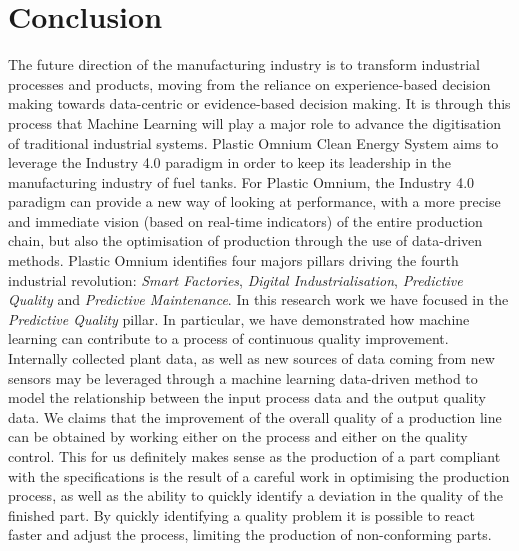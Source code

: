 \chapter*{Conclusion}
\thispagestyle{empty}

The future direction of the manufacturing industry is to transform industrial processes and products, moving from the reliance on experience-based decision making towards data-centric or evidence-based decision making. It is through this process that Machine Learning will play a major role to advance the digitisation of traditional industrial systems. Plastic Omnium Clean Energy System aims to leverage the Industry 4.0 paradigm in order to keep its leadership in the manufacturing industry of fuel tanks. For Plastic Omnium, the Industry 4.0 paradigm can provide a new way of looking at performance, with a more precise and immediate vision (based on real-time indicators) of the entire production chain, but also the optimisation of production through the use of data-driven methods. Plastic Omnium identifies four majors pillars driving the fourth industrial revolution: \textit{Smart Factories}, \textit{Digital Industrialisation}, \textit{Predictive Quality} and \textit{Predictive Maintenance}. In this research work we have focused in the \textit{Predictive Quality} pillar. In particular, we have demonstrated how machine learning can contribute to a process of continuous quality improvement. Internally collected plant data, as well as new sources of data coming from new sensors may be leveraged through a machine learning data-driven method to model the relationship between the input process data and the output quality data. We claims that the improvement of the overall quality of a production line can be obtained by working either on the process and either on the quality control. This for us definitely makes sense as the production of a part compliant with the specifications is the result of a careful work in optimising the production process, as well as the ability to quickly identify a deviation in the quality of the finished part. By quickly identifying a quality problem it is possible to react faster and adjust the process, limiting the production of non-conforming parts.
